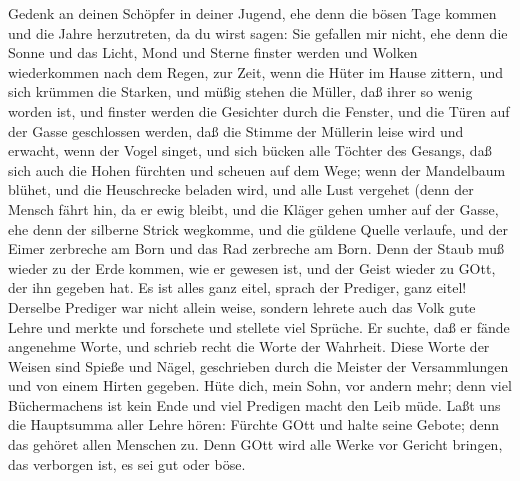  Gedenk an deinen Schöpfer in deiner Jugend, ehe denn die
bösen Tage kommen und die Jahre herzutreten, da du wirst sagen: Sie
gefallen mir nicht,  ehe denn die Sonne und das Licht, Mond
und Sterne finster werden und Wolken wiederkommen nach dem Regen,
 zur Zeit, wenn die Hüter im Hause zittern, und sich krümmen
die Starken, und müßig stehen die Müller, daß ihrer so wenig worden ist,
und finster werden die Gesichter durch die Fenster,  und die
Türen auf der Gasse geschlossen werden, daß die Stimme der Müllerin
leise wird und erwacht, wenn der Vogel singet, und sich bücken alle
Töchter des Gesangs,  daß sich auch die Hohen fürchten und
scheuen auf dem Wege; wenn der Mandelbaum blühet, und die Heuschrecke
beladen wird, und alle Lust vergehet (denn der Mensch fährt hin, da er
ewig bleibt, und die Kläger gehen umher auf der Gasse,  ehe
denn der silberne Strick wegkomme, und die güldene Quelle verlaufe, und
der Eimer zerbreche am Born und das Rad zerbreche am Born. 
Denn der Staub muß wieder zu der Erde kommen, wie er gewesen ist, und
der Geist wieder zu GOtt, der ihn gegeben hat.  Es ist alles
ganz eitel, sprach der Prediger, ganz eitel!  Derselbe
Prediger war nicht allein weise, sondern lehrete auch das Volk gute
Lehre und merkte und forschete und stellete viel Sprüche. 
Er suchte, daß er fände angenehme Worte, und schrieb recht die Worte der
Wahrheit.  Diese Worte der Weisen sind Spieße und Nägel,
geschrieben durch die Meister der Versammlungen und von einem Hirten
gegeben.  Hüte dich, mein Sohn, vor andern mehr; denn viel
Büchermachens ist kein Ende und viel Predigen macht den Leib müde.
 Laßt uns die Hauptsumma aller Lehre hören: Fürchte GOtt
und halte seine Gebote; denn das gehöret allen Menschen zu.
 Denn GOtt wird alle Werke vor Gericht bringen, das
verborgen ist, es sei gut oder böse.

